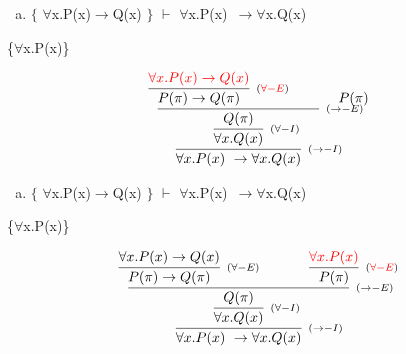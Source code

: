 \documentclass[aspectratio=43]{beamer}
\newcommand{\ria}{$\rightarrow$}
\newcommand{\fall}{$\forall$}
\begin{document}
    \begin{frame}[fragile]
    
    	\begin{enumerate}[f)]
			\item $\{$ \fall x.P(x)\ria Q(x) $\}$ $\vdash$ \fall x.P(x)\ \ria \fall x.Q(x) \\
		\end{enumerate}
        \{\fall x.P(x)\}
        \vspace{45pt}
        
        \[
        \begin{array}{c}
		
        	\infer[_{(\to -I)}]
            	{\forall x.P(x)\ \to \forall x.Q(x)}
            	{\infer[_{(\forall -I)}] 
                	{\forall x.Q(x)}
                    {\infer[_{(\to -E)}]
                    	{Q(\pi)}
                        {\infer[_{(\textcolor{red}{\forall -E})}]
                        	{P(\pi)\rightarrow Q(\pi)}
                            {\textcolor{red}{\forall x.P(x)\to Q(x)}}
                        \hspace{35pt} 
                        P(\pi)
                        }
                    }
                 }   
        
		\end{array}
        \]
        
	\end{frame}
    
    \begin{frame}[fragile]
    
    	\begin{enumerate}[f)]
			\item $\{$ \fall x.P(x)\ria Q(x) $\}$ $\vdash$ \fall x.P(x)\ \ria \fall x.Q(x) \\
		\end{enumerate}
        \{\fall x.P(x)\}
        \vspace{40pt}
        
        \[
        \begin{array}{c}
		
        	\infer[_{(\to -I)}]
            	{\forall x.P(x)\ \to \forall x.Q(x)}
            	{\infer[_{(\forall -I)}] 
                	{\forall x.Q(x)}
                    {\infer[_{(\to -E)}]
                    	{Q(\pi)}
                        {\infer[_{(\forall -E)}]
                        	{P(\pi)\rightarrow Q(\pi)}
                            {\forall x.P(x)\to Q(x)}
                        \hspace{35pt} 
                        \infer[_{(\textcolor{red}{\forall -E})}] 
                        	{P(\pi)}
                            {\textcolor{red}{\forall x.P(x)}}
                        }
                    }
                 }   
        
		\end{array}
        \]
        
	\end{frame}
    
\end{document}
